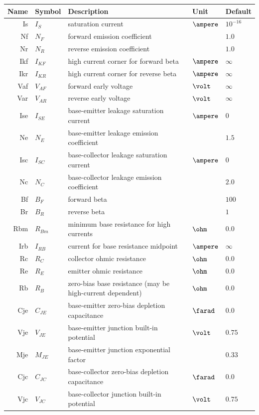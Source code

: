 \documentclass[10pt]{report}
\begin{document}
\begin{tabular}{rllll}
Name & Symbol & Description & Unit & Default\\
\hline
Is & $I_{S}$ & saturation current & $\ampere$ & $10^{-16}$\\
Nf & $N_F$ & forward emission coefficient & & $1.0$\\
Nr & $N_R$ & reverse emission coefficient & & $1.0$\\
Ikf & $I_{KF}$ & high current corner for forward beta & $\ampere$ & $\infty$\\
Ikr & $I_{KR}$ & high current corner for reverse beta & $\ampere$ & $\infty$\\
Vaf & $V_{AF}$ & forward early voltage & $\volt$ & $\infty$\\
Var & $V_{AR}$ & reverse early voltage & $\volt$ & $\infty$\\
Ise & $I_{SE}$ & base-emitter leakage saturation current & $\ampere$ & $0$\\
Ne & $N_E$ & base-emitter leakage emission coefficient & & $1.5$\\
Isc & $I_{SC}$ & base-collector leakage saturation current & $\ampere$ & $0$\\
Nc & $N_C$ & base-collector leakage emission coefficient & & $2.0$\\
Bf & $B_F$ & forward beta & & $100$\\
Br & $B_R$ & reverse beta & & $1$\\
Rbm & $R_{Bm}$ & minimum base resistance for high currents & $\ohm$ & $0.0$\\
Irb & $I_{RB}$ & current for base resistance midpoint & $\ampere$ & $\infty$\\
Rc & $R_{C}$ & collector ohmic resistance & $\ohm$ & $0.0$\\
Re & $R_{E}$ & emitter ohmic resistance & $\ohm$ & $0.0$\\
Rb & $R_{B}$ & zero-bias base resistance (may be high-current dependent) & $\ohm$ & $0.0$\\
Cje & $C_{JE}$ & base-emitter zero-bias depletion capacitance & $\farad$ & $0.0$\\
Vje & $V_{JE}$ & base-emitter junction built-in potential & $\volt$ & $0.75$\\
Mje & $M_{JE}$ & base-emitter junction exponential factor & & $0.33$\\
Cjc & $C_{JC}$ & base-collector zero-bias depletion capacitance & $\farad$ & $0.0$\\
Vjc & $V_{JC}$ & base-collector junction built-in potential & $\volt$ & $0.75$\\

\end{tabular}
\end{document}
